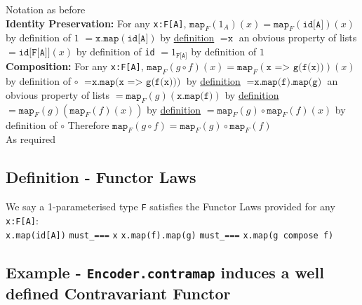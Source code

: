 \documentclass[9pt]{article} %
\begin{document}
Notation as before \newline
\\
\noindent \textbf{Identity Preservation:} For any \texttt{x:F[A]}, \newline
$\texttt{map}_F(1_A)(x) = \texttt{map}_F(\texttt{id[A]})(x)$ by definition of $1$ \newline
$= \texttt{x.map}(\texttt{id[A]})$ by \hyperref[Functor Example]{definition} \newline
$= \texttt{x}$ an obvious property of lists \newline
$= \texttt{id[F[A]]}(x)$ by definition of \texttt{id} \newline
$= 1_{\texttt{F[A]}}$ by definition of $1$ \newline
\\
\noindent \textbf{Composition:} For any \texttt{x:F[A]}, \newline
$\texttt{map}_F(g \circ f)(x) = \texttt{map}_F(\texttt{x => g(f(x))})(x)$ by definition of $\circ$ \newline
$= \texttt{x.map(x => g(f(x)))}$ by \hyperref[Functor Example]{definition} \newline
$= \texttt{x.map(f).map(g)}$ an obvious property of lists \newline
$= \texttt{map}_F(g)(\texttt{x.map(f)})$ by \hyperref[Functor Example]{definition} \newline
$= \texttt{map}_F(g)(\texttt{map}_F(f)(x))$ by \hyperref[Functor Example]{definition} \newline
$= \texttt{map}_F(g) \circ \texttt{map}_F(f)(x)$ by definition of $\circ$ \newline
Therefore $\texttt{map}_F(g \circ f) = \texttt{map}_F(g) \circ \texttt{map}_F(f)$ \newline
\\
\noindent As required \blacksquare

\subsection{Definition - Functor Laws}

We say a 1-parameterised type \texttt{F} satisfies the Functor Laws provided for any \texttt{x:F[A]}:
\\
\noindent \texttt{x.map(id[A])} \texttt{must\_===} \texttt{x} \newline
\texttt{x.map(f).map(g)} \texttt{must\_===} \texttt{x.map(g compose f)} \newline

\subsection{Example - \texttt{Encoder.contramap} induces a well defined Contravariant Functor}
\end{document}
